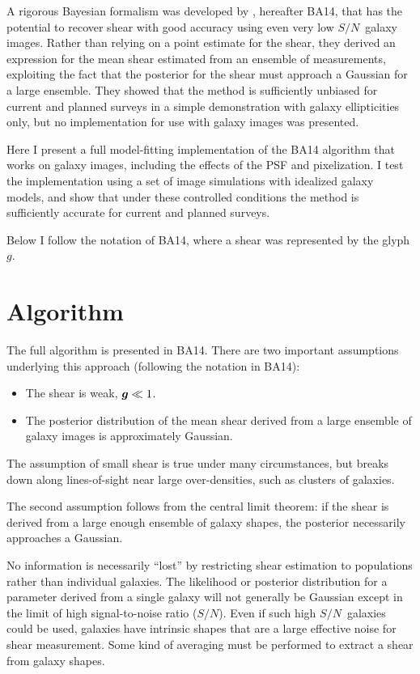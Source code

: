 \documentclass[usegraphicx,usenatbib]{mn2e}
\newcommand{\sn}{$S/N$}
\newcommand{\vecg}{\mbox{\boldmath $g$}}
\begin{document}
A rigorous Bayesian formalism was developed by \cite{ba14}, hereafter BA14,
that has the potential to recover shear with good accuracy using even very low
\sn\ galaxy images.  Rather than relying on a point estimate for the shear,
they derived an expression for the mean shear estimated from an ensemble of
measurements, exploiting the fact that the posterior for the shear must
approach a Gaussian for a large ensemble.  They showed that the method is
sufficiently unbiased for current and planned surveys in a simple demonstration
with galaxy ellipticities only, but no implementation for use with galaxy
images was presented.

Here I present a full model-fitting implementation of the BA14 algorithm that
works on galaxy images, including the effects of the PSF and pixelization.  I
test the implementation using a set of image simulations with idealized galaxy
models, and show that under these controlled conditions the method is
sufficiently accurate for current and planned surveys.

Below I follow the notation of BA14, where a shear was represented by the
glyph \vecg.

\section{Algorithm} \label{sec:algo}

The full algorithm is presented in BA14.  There are two important assumptions
underlying this approach (following the notation in BA14):

\begin{itemize}

    \item The shear is weak, $\vecg \ll 1$.

    \item The posterior distribution of the mean shear derived from a large
        ensemble of galaxy images is approximately Gaussian.

\end{itemize}

The assumption of small shear is true under many circumstances, but breaks down
along lines-of-sight near large over-densities, such as clusters of galaxies.

The second assumption follows from the central limit theorem: if the shear is
derived from a large enough ensemble of galaxy shapes, the posterior
necessarily approaches a Gaussian.

No information is necessarily ``lost'' by restricting shear estimation to
populations rather than individual galaxies.  The likelihood or posterior
distribution for a parameter derived from a single galaxy will not generally be
Gaussian except in the limit of high signal-to-noise ratio (\sn). Even if such
high \sn\ galaxies could be used, galaxies have intrinsic shapes that are a
large effective noise for shear measurement.  Some kind of averaging must be
performed to extract a shear from galaxy shapes.  
\end{document}
